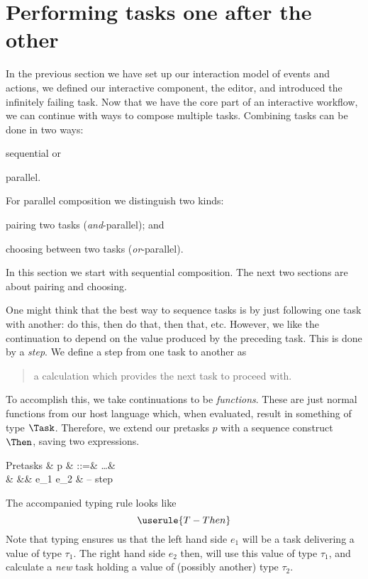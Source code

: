 
\section{Performing tasks one after the other}

In the previous section we have set up our interaction model of events and actions,
we defined our interactive component, the editor,
and introduced the infinitely failing task.
Now that we have the core part of an interactive workflow,
we can continue with ways to compose multiple tasks.
Combining tasks can be done in two ways:
\begin{enumerate*}
  \item sequential or
  \item parallel.
\end{enumerate*}
For parallel composition we distinguish two kinds:
\begin{enumerate*}[(a)]
  \item pairing two tasks (\emph{and}-parallel); and
  \item choosing between two tasks (\emph{or}-parallel).
\end{enumerate*}
In this section we start with sequential composition.
The next two sections are about pairing and choosing.

One might think that the best way to sequence tasks is by just following one task with another:
do this, then do that, then that, etc.
However, we like the continuation to depend on the value produced by the preceding task.
This is done by a \emph{step}.
We define a step from one task to another as
\begin{quote}
  a calculation which provides the next task to proceed with.
\end{quote}

To accomplish this,
we take continuations to be \emph{functions}.
These are just normal functions from our host language which,
when evaluated, result in something of type $\Task$.
Therefore,
we extend our pretasks $p$ with a sequence construct $\Then$,
saving two expressions.
\begin{grammar}
  Pretasks
    & p & ::=& \ldots        & \\
    &   &\mid& e_1 \Then e_2 & – step \\
\end{grammar}

The accompanied typing rule looks like
\begin{equation*}
  \userule{T-Then}
\end{equation*}
Note that typing ensures us that the left hand side $e_1$ will be a task delivering a value of type $\tau_1$.
The right hand side $e_2$ then, will use this value of type $\tau_1$,
and calculate a \emph{new} task holding a value of (possibly another) type $\tau_2$.


